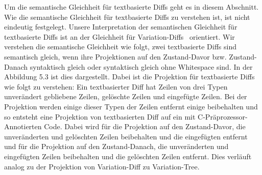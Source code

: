 Um die semantische Gleichheit für textbasierte Diffs geht es in diesem Abschnitt. Wie die semantische Gleichheit für textbasierte Diffs zu verstehen ist, ist nicht eindeutig festgelegt. Unsere Interpretation der semantischen Gleichheit für textbasierte Diffs ist an der Gleichheit für Variation-Diffs~\cite{BSG+:SPLC23} orientiert. Wir verstehen die semantische Gleichheit wie folgt, zwei textbasierte Diffs sind semantisch gleich, wenn ihre Projektionen auf den Zustand-Davor bzw. Zustand-Danach syntaktisch gleich oder syntaktisch gleich ohne Whitespace sind. In der Abbildung 5.3 ist dies dargestellt. Dabei ist die Projektion für textbasierte Diffs wie folgt zu verstehen: Ein textbasierter Diff hat Zeilen von drei Typen unverändert gebliebene Zeilen, gelöschte Zeilen und eingefügte Zeilen. Bei der Projektion werden einige dieser Typen der Zeilen entfernt einige beibehalten und so entsteht eine Projektion von textbasierten Diff auf ein mit C-Präprozessor-Annotierten Code. Dabei wird für die Projektion auf den Zustand-Davor, die unveränderten und gelöschten Zeilen beibehalten und die eingefügten entfernt und für die Projektion auf den Zustand-Danach, die unveränderten und eingefügten Zeilen beibehalten und die gelöschten Zeilen entfernt. Dies verläuft analog zu der Projektion von Variation-Diff zu Variation-Tree.


